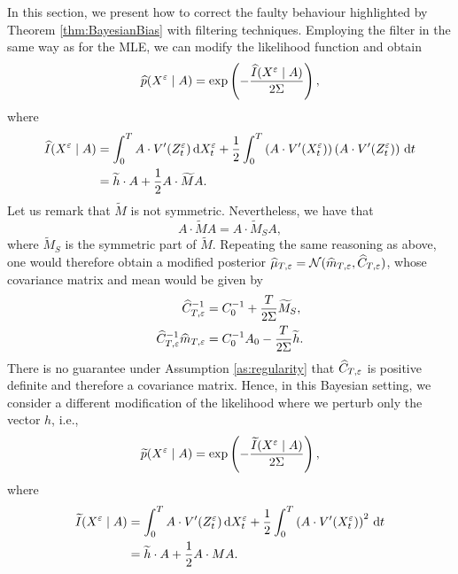 \documentclass[10pt]{article}
\begin{document}
In this section, we present how to correct the faulty behaviour highlighted by Theorem \ref{thm:BayesianBias} with filtering techniques. Employing the filter in the same way as for the MLE, we can modify the likelihood function and obtain 
\begin{equation}
	\widehat p(X^\varepsilon \mid A) = \exp\left(-\frac{\widehat I(X^\varepsilon\mid A)}{2\Sigma} \right), 
\end{equation}
where 
\begin{equation}
\begin{aligned}
	\widehat I(X^\varepsilon \mid A) & = \int_0^T A \cdot V'(Z^\varepsilon_t) \,\mathrm{d} X^\varepsilon_t + \frac12 \int_0^T \left(A \cdot V'(X^\varepsilon_t)\right)\left(A \cdot V'(Z^\varepsilon_t)\right) \,\mathrm{d} t \\
	&= \widetilde h \cdot A + \frac12 A \cdot \widetilde M A.
\end{aligned}
\end{equation}
Let us remark that $\widetilde M$ is not symmetric. Nevertheless, we have that
\begin{equation}
	A \cdot \widetilde M A = A \cdot \widetilde M_S A,
\end{equation}
where $\widetilde M_S$ is the symmetric part of $\widetilde M$. Repeating the same reasoning as above, one would therefore obtain a modified posterior $\widehat \mu_{T, \varepsilon} = \mathcal N(\widehat m_{T, \varepsilon}, \widehat C_{T, \varepsilon})$, whose covariance matrix and mean would be given by
\begin{equation}
\begin{aligned}
	\widehat C_{T, \varepsilon}^{-1} &= C_0^{-1} + \frac{T}{2\Sigma} \widetilde M_S, \\
	\widehat C_{T,\varepsilon}^{-1}\widehat m_{T,\varepsilon} &= C_0^{-1}A_0 - \frac{T}{2\Sigma} \widetilde h. 
\end{aligned}	
\end{equation}
There is no guarantee under Assumption \ref{as:regularity} that $\widehat C_{T, \varepsilon}$ is positive definite and therefore a covariance matrix. Hence, in this Bayesian setting, we consider a different modification of the likelihood where we perturb only the vector $h$, i.e.,
\begin{equation}
	\widetilde p(X^\varepsilon \mid A) = \exp\left(-\frac{\widetilde I(X^\varepsilon\mid A)}{2\Sigma} \right), 
\end{equation}
where 
\begin{equation}
\begin{aligned}
	\widetilde I(X^\varepsilon \mid A) & = \int_0^T A \cdot V'(Z^\varepsilon_t) \,\mathrm{d} X^\varepsilon_t + \frac12 \int_0^T \left(A \cdot V'(X^\varepsilon_t)\right)^2 \,\mathrm{d} t \\
	&= \widetilde h \cdot A + \frac12 A \cdot M A.
\end{aligned}
\end{equation}
\end{document}
